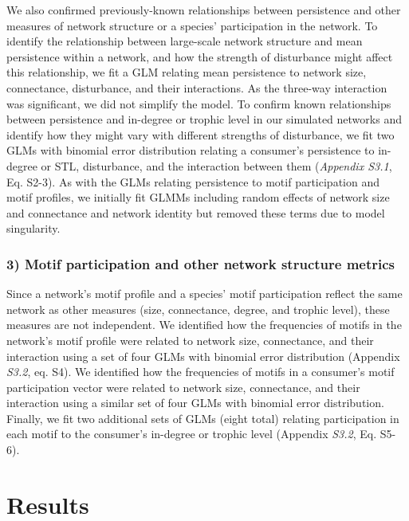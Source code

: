 \documentclass[12pt]{article}
\begin{document}
\begin{spacing}{2.0}
            We also confirmed previously-known relationships between persistence and other measures of network structure or a species' participation in the network.
            To identify the relationship between large-scale network structure and mean persistence within a network, and how the strength of disturbance might affect this relationship, we fit a GLM relating mean persistence to network size, connectance, disturbance, and their interactions.
            As the three-way interaction was significant, we did not simplify the model. 
            To confirm known relationships between persistence and in-degree or trophic level in our simulated networks and identify how they might vary with different strengths of disturbance, we fit two GLMs with binomial error distribution relating a consumer's persistence to in-degree or STL, disturbance, and the interaction between them (\emph{Appendix S3.1}, Eq. S2-3).
            As with the GLMs relating persistence to motif participation and motif profiles, we initially fit GLMMs including random effects of network size and connectance and network identity but removed these terms due to model singularity.



        \subsubsection*{3) Motif participation and other network structure metrics}

            Since a network's motif profile and a species' motif participation reflect the same network as other measures (size, connectance, degree, and trophic level), these measures are not independent. 
            We identified how the frequencies of motifs in the network's motif profile were related to network size, connectance, and their interaction using a set of four GLMs with binomial error distribution (Appendix \emph{S3.2}, eq. S4).
            We identified how the frequencies of motifs in a consumer's motif participation vector were related to network size, connectance, and their interaction using a similar set of four GLMs with binomial error distribution.
            Finally, we fit two additional sets of GLMs (eight total) relating participation in each motif to the consumer's in-degree or trophic level (Appendix \emph{S3.2}, Eq. S5-6).
        
        
\section*{Results}


\end{spacing}
\end{document}

